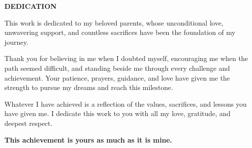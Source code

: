 
\begin{center}
	{\Large\bfseries DEDICATION}

This work is dedicated to my beloved parents, whose unconditional love, unwavering support, and countless sacrifices have been the foundation of my journey.

\vspace{0.5cm}

Thank you for believing in me when I doubted myself, encouraging me when the path seemed difficult, and standing beside me through every challenge and achievement. Your patience, prayers, guidance, and love have given me the strength to pursue my dreams and reach this milestone.

\vspace{0.5cm}

Whatever I have achieved is a reflection of the values, sacrifices, and lessons you have given me. I dedicate this work to you with all my love, gratitude, and deepest respect.

\vspace{0.8cm}

\textbf{This achievement is yours as much as it is mine.}

\end{center}

\clearpage